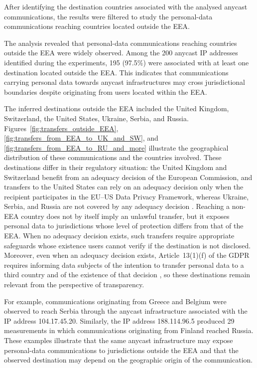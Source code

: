 After identifying the destination countries associated with the analysed anycast communications, the results were filtered to study the personal-data communications reaching countries located outside the EEA.

The analysis revealed that personal-data communications reaching countries outside the EEA were widely observed. Among the 200 anycast IP addresses identified during the experiments, 195 (97.5\%) were associated with at least one destination located outside the EEA. This indicates that communications carrying personal data towards anycast infrastructures may cross jurisdictional boundaries despite originating from users located within the EEA.

The inferred destinations outside the EEA included the United Kingdom, Switzerland, the United States, Ukraine, Serbia, and Russia. Figures~\ref{fig:transfers_outside_EEA}, \ref{fig:transfers_from_EEA_to_UK_and_SW}, and \ref{fig:transfers_from_EEA_to_RU_and_more} illustrate the geographical distribution of these communications and the countries involved. These destinations differ in their regulatory situation: the United Kingdom and Switzerland benefit from an adequacy decision of the European Commission, and transfers to the United States can rely on an adequacy decision only when the recipient participates in the EU--US Data Privacy Framework, whereas Ukraine, Serbia, and Russia are not covered by any adequacy decision \cite{DataCountries}. Reaching a non-EEA country does not by itself imply an unlawful transfer, but it exposes personal data to jurisdictions whose level of protection differs from that of the EEA. When no adequacy decision exists, such transfers require appropriate safeguards whose existence users cannot verify if the destination is not disclosed. Moreover, even when an adequacy decision exists, Article~13(1)(f) of the GDPR requires informing data subjects of the intention to transfer personal data to a third country and of the existence of that decision \cite{REGULATIONSRelevance, JUSTICEwp260rev.01}, so these destinations remain relevant from the perspective of transparency.

For example, communications originating from Greece and Belgium were observed to reach Serbia through the anycast infrastructure associated with the IP address 104.17.45.20. Similarly, the IP address 188.114.96.5 produced 29 measurements in which communications originating from Finland reached Russia. These examples illustrate that the same anycast infrastructure may expose personal-data communications to jurisdictions outside the EEA and that the observed destination may depend on the geographic origin of the communication.

